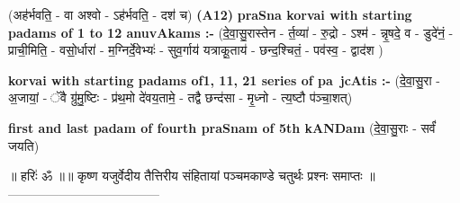 \documentclass[17pt]{extarticle}
\begin{document}
                  \newline
                      (अह॑र्भवति॒ - वा अश्वो - ऽह॑र्भवति॒ - दश॑ च)  \textbf{(A12)} \newline \newline
\textbf{praSna korvai with starting padams of 1 to 12 anuvAkams :-} \newline
(दे॒वा॒सु॒रास्तेन - र्त॒व्या॑ - रु॒द्रो - ऽश्म॑ - न्नृ॒षदे॒ व - डुदे॑नं॒ - प्राची॒मिति॒ - वसो॒॒र्धारा॑ - म॒ग्निर्दे॒वेभ्यः॑ - सुव॒र्गाय॑ यत्राकू॒ताय॑ - छन्द॒श्चितं॒ - पव॑स्व॒ - द्वाद॑श ) \newline

\textbf{korvai with starting padams of1, 11, 21 series of pa~jcAtis :-} \newline
(दे॒वा॒सु॒रा - अ॒जायां॒ - ॅवै ग्रु॑मु॒ष्टिः - प्र॑थ॒मो दे॑वय॒तामे॒ - तद्वै छन्द॑सा - मृ॒ध्नो - त्य॒ष्टौ प॑ञ्चा॒शत्) \newline

\textbf{first and last padam of fourth praSnam of 5th kANDam} \newline
(दे॒वा॒सु॒राः - सर्वं॑ जयति) \newline 


॥ हरिः॑ ॐ ॥॥ कृष्ण यजुर्वेदीय तैत्तिरीय संहितायां पञ्चमकाण्डे चतुर्थः प्रश्नः समाप्तः ॥
------------------------------------ \newline
\pagebreak
\pagebreak
        
\end{document}
